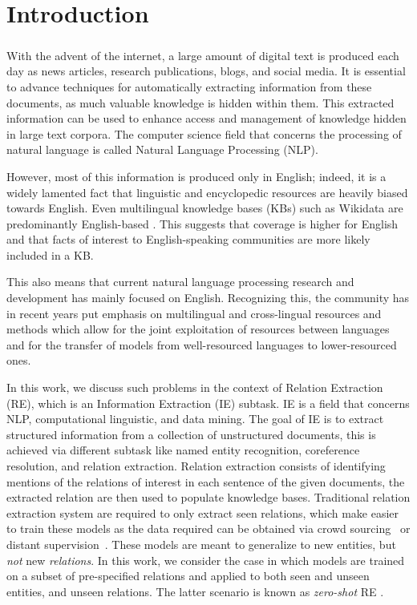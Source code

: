 \chapter{Introduction}
\paragraph{}

With the advent of the internet, a large amount of digital text is produced each day as news articles, research publications, blogs, and social media. It is essential to advance techniques for automatically extracting information from these documents, as much valuable knowledge is hidden within them. This extracted information can be used to enhance access and management of knowledge hidden in large text corpora. The computer science field that concerns the processing of natural language is called Natural Language Processing (NLP). 

However, most of this information is produced only in English; indeed, it is a widely lamented fact that linguistic and encyclopedic resources are heavily biased towards English. Even multilingual knowledge bases (KBs) such as Wikidata \citep{vwikidata} are predominantly English-based \citep{Kaffee:Simperl:18}. This suggests that coverage is higher for English and that facts of interest to English-speaking communities are more likely included in a KB.

This also means that current natural language processing research and development has mainly focused on English. Recognizing this, the community has in recent years put emphasis on multilingual and cross-lingual resources and methods which allow for the joint exploitation of resources between languages and for the transfer of models from well-resourced languages to lower-resourced ones.

In this work, we discuss such problems in the context of Relation Extraction (RE), which is an Information Extraction (IE) subtask. IE is a field that concerns NLP, computational linguistic, and data mining. The goal of IE is to extract structured information from a collection of unstructured documents, this is achieved via different subtask like named entity recognition, coreference resolution, and relation extraction. Relation extraction consists of identifying mentions of the relations of interest in each sentence of the given documents, the extracted relation are then used to populate knowledge bases. Traditional relation extraction system are required to only extract seen relations, which make easier to train these models as the data required can be obtained via crowd sourcing~\citep{liu-etal-2016-effective} or distant supervision~\citep{hoffmann-etal-2011-knowledge}. These models are meant to generalize to new entities, but {\em not} new {\em relations}. In this work, we consider the  case in which models are trained on a subset of pre-specified relations and applied to both seen and unseen entities, and unseen relations. The latter scenario is known as {\em zero-shot} RE \citep{rocktaschel2015injecting}.

